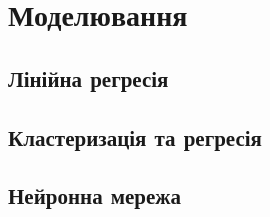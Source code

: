 \chapter{Моделювання}


\section{Лінійна регресія}


\section{Кластеризація та регресія}


\section{Нейронна мережа}